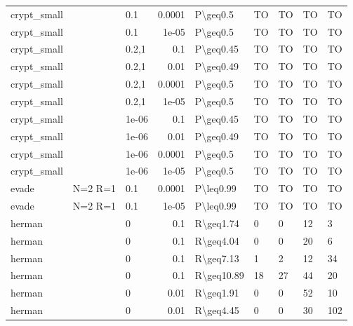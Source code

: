 \begin{longtable}{lllrlllll}
 crypt\_small   &           & 0.1   & 0.0001 & P\textbackslash{}geq0.5   & TO   & TO   & TO       & TO      \\
 crypt\_small   &           & 0.1   & 1e-05  & P\textbackslash{}geq0.5   & TO   & TO   & TO       & TO      \\
 crypt\_small   &           & 0.2,1 & 0.1    & P\textbackslash{}geq0.45  & TO   & TO   & TO       & TO      \\
 crypt\_small   &           & 0.2,1 & 0.01   & P\textbackslash{}geq0.49  & TO   & TO   & TO       & TO      \\
 crypt\_small   &           & 0.2,1 & 0.0001 & P\textbackslash{}geq0.5   & TO   & TO   & TO       & TO      \\
 crypt\_small   &           & 0.2,1 & 1e-05  & P\textbackslash{}geq0.5   & TO   & TO   & TO       & TO      \\
 crypt\_small   &           & 1e-06 & 0.1    & P\textbackslash{}geq0.45  & TO   & TO   & TO       & TO      \\
 crypt\_small   &           & 1e-06 & 0.01   & P\textbackslash{}geq0.49  & TO   & TO   & TO       & TO      \\
 crypt\_small   &           & 1e-06 & 0.0001 & P\textbackslash{}geq0.5   & TO   & TO   & TO       & TO      \\
 crypt\_small   &           & 1e-06 & 1e-05  & P\textbackslash{}geq0.5   & TO   & TO   & TO       & TO      \\
 evade         & N=2 R=1   & 0.1   & 0.0001 & P\textbackslash{}leq0.99  & TO   & TO   & TO       & TO      \\
 evade         & N=2 R=1   & 0.1   & 1e-05  & P\textbackslash{}leq0.99  & TO   & TO   & TO       & TO      \\
 herman        &           & 0     & 0.1    & R\textbackslash{}geq1.74  & 0    & 0    & 12       & 3       \\
 herman        &           & 0     & 0.1    & R\textbackslash{}geq4.04  & 0    & 0    & 20       & 6       \\
 herman        &           & 0     & 0.1    & R\textbackslash{}geq7.13  & 1    & 2    & 12       & 34      \\
 herman        &           & 0     & 0.1    & R\textbackslash{}geq10.89 & 18   & 27   & 44       & 20      \\
 herman        &           & 0     & 0.01   & R\textbackslash{}geq1.91  & 0    & 0    & 52       & 10      \\
 herman        &           & 0     & 0.01   & R\textbackslash{}geq4.45  & 0    & 0    & 30       & 102     \\

\end{longtable}

